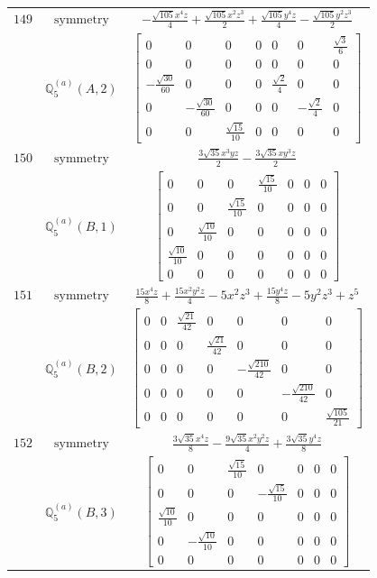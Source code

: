 \documentclass[fleqn,8pt,landscape]{jsarticle}
\begin{document}
\begin{longtable}{ccc}
$ 149 $ & $ \text{symmetry} $ & $ - \frac{\sqrt{105} x^{4} z}{4} + \frac{\sqrt{105} x^{2} z^{3}}{2} + \frac{\sqrt{105} y^{4} z}{4} - \frac{\sqrt{105} y^{2} z^{3}}{2} $ \\
$  $ & $ \mathbb{Q}_{5}^{(a)}(A,2) $ & $ \begin{bmatrix} 0 & 0 & 0 & 0 & 0 & 0 & \frac{\sqrt{3}}{6} \\ 0 & 0 & 0 & 0 & 0 & 0 & 0 \\ - \frac{\sqrt{30}}{60} & 0 & 0 & 0 & \frac{\sqrt{2}}{4} & 0 & 0 \\ 0 & - \frac{\sqrt{30}}{60} & 0 & 0 & 0 & - \frac{\sqrt{2}}{4} & 0 \\ 0 & 0 & \frac{\sqrt{15}}{10} & 0 & 0 & 0 & 0 \end{bmatrix} $ \\ \hline
$ 150 $ & $ \text{symmetry} $ & $ \frac{3 \sqrt{35} x^{3} y z}{2} - \frac{3 \sqrt{35} x y^{3} z}{2} $ \\
$  $ & $ \mathbb{Q}_{5}^{(a)}(B,1) $ & $ \begin{bmatrix} 0 & 0 & 0 & \frac{\sqrt{15}}{10} & 0 & 0 & 0 \\ 0 & 0 & \frac{\sqrt{15}}{10} & 0 & 0 & 0 & 0 \\ 0 & \frac{\sqrt{10}}{10} & 0 & 0 & 0 & 0 & 0 \\ \frac{\sqrt{10}}{10} & 0 & 0 & 0 & 0 & 0 & 0 \\ 0 & 0 & 0 & 0 & 0 & 0 & 0 \end{bmatrix} $ \\ \hline
$ 151 $ & $ \text{symmetry} $ & $ \frac{15 x^{4} z}{8} + \frac{15 x^{2} y^{2} z}{4} - 5 x^{2} z^{3} + \frac{15 y^{4} z}{8} - 5 y^{2} z^{3} + z^{5} $ \\
$  $ & $ \mathbb{Q}_{5}^{(a)}(B,2) $ & $ \begin{bmatrix} 0 & 0 & \frac{\sqrt{21}}{42} & 0 & 0 & 0 & 0 \\ 0 & 0 & 0 & \frac{\sqrt{21}}{42} & 0 & 0 & 0 \\ 0 & 0 & 0 & 0 & - \frac{\sqrt{210}}{42} & 0 & 0 \\ 0 & 0 & 0 & 0 & 0 & - \frac{\sqrt{210}}{42} & 0 \\ 0 & 0 & 0 & 0 & 0 & 0 & \frac{\sqrt{105}}{21} \end{bmatrix} $ \\ \hline
$ 152 $ & $ \text{symmetry} $ & $ \frac{3 \sqrt{35} x^{4} z}{8} - \frac{9 \sqrt{35} x^{2} y^{2} z}{4} + \frac{3 \sqrt{35} y^{4} z}{8} $ \\
$  $ & $ \mathbb{Q}_{5}^{(a)}(B,3) $ & $ \begin{bmatrix} 0 & 0 & \frac{\sqrt{15}}{10} & 0 & 0 & 0 & 0 \\ 0 & 0 & 0 & - \frac{\sqrt{15}}{10} & 0 & 0 & 0 \\ \frac{\sqrt{10}}{10} & 0 & 0 & 0 & 0 & 0 & 0 \\ 0 & - \frac{\sqrt{10}}{10} & 0 & 0 & 0 & 0 & 0 \\ 0 & 0 & 0 & 0 & 0 & 0 & 0 \end{bmatrix} $ \\ \hline

\end{longtable}
\end{document}
